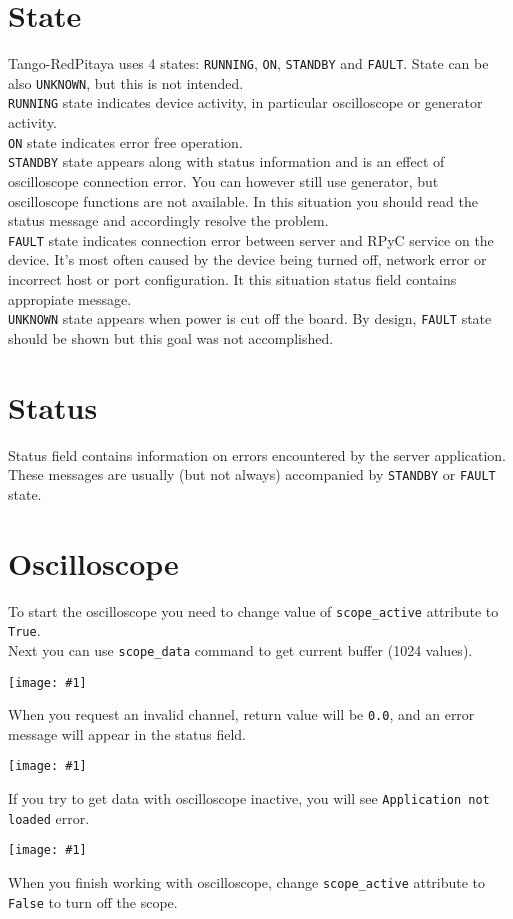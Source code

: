 \documentclass[12pt,a4paper]{article}
\newcommand{\screenshot}[1]{\begin{minipage}[c]{\textwidth}\texttt{[image: \#1]}\end{minipage}}
\begin{document}
	\section{State}
	Tango-RedPitaya uses 4 states: \texttt{RUNNING}, \texttt{ON}, \texttt{STANDBY} and \texttt{FAULT}.
	State can be also \texttt{UNKNOWN}, but this is not intended.\\
	\texttt{RUNNING} state indicates device activity, in particular oscilloscope or generator activity.\\
	\texttt{ON} state indicates error free operation.\\
	\texttt{STANDBY} state appears along with status information and is an effect of oscilloscope connection error.
	You can however still use generator, but oscilloscope functions are not available. In this situation you should read the status message and accordingly resolve the problem.\\
	\texttt{FAULT} state indicates connection error between server and RPyC service on the device. It's most often caused by the device being turned off, network error or incorrect host or port configuration. It this situation status field contains appropiate message.\\
	\texttt{UNKNOWN} state appears when power is cut off the board. By design, \texttt{FAULT} state should be shown but this goal was not accomplished.

	\section{Status}
	Status field contains information on errors encountered by the server application. These messages are usually (but not always) accompanied by \texttt{STANDBY} or \texttt{FAULT} state.\\

	\section{Oscilloscope}
	To start the oscilloscope you need to change value of \texttt{scope\_active} attribute to \texttt{True}.\\
	Next you can use \texttt{scope\_data} command to get current buffer (1024 values).\\
	\screenshot{screenshots/scope_data.png}
	When you request an invalid channel, return value will be \texttt{0.0}, and an error message will appear in the status field.\\
	\screenshot{screenshots/invalid_scope_channel.png}
	If you try to get data with oscilloscope inactive, you will see \texttt{Application not loaded} error.\\
	\screenshot{screenshots/scope_inactive.png}
	When you finish working with oscilloscope, change \texttt{scope\_active} attribute to \texttt{False} to turn off the scope.
\end{document}
